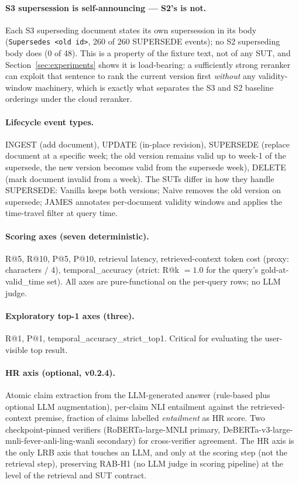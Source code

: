 \documentclass[11pt,a4paper]{article}
\begin{document}
\paragraph{S3 supersession is self-announcing --- S2's is not.} Each S3 superseding document states its own supersession in its body (\texttt{Supersedes <old id>}, 260 of 260 SUPERSEDE events); no S2 superseding body does (0 of 48). This is a property of the fixture text, not of any SUT, and Section~\ref{sec:experiments} shows it is load-bearing: a sufficiently strong reranker can exploit that sentence to rank the current version first \emph{without} any validity-window machinery, which is exactly what separates the S3 and S2 baseline orderings under the cloud reranker.

\paragraph{Lifecycle event types.} INGEST (add document), UPDATE (in-place revision), SUPERSEDE (replace document at a specific week; the old version remains valid up to week-1 of the supersede, the new version becomes valid from the supersede week), DELETE (mark document invalid from a week). The SUTs differ in how they handle SUPERSEDE: Vanilla keeps both versions; Naive removes the old version on supersede; JAMES annotates per-document validity windows and applies the time-travel filter at query time.

\paragraph{Scoring axes (seven deterministic).} R@5, R@10, P@5, P@10, retrieval latency, retrieved-context token cost (proxy: characters $/$ 4), temporal\_accuracy (strict: R@k $= 1.0$ for the query's gold-at-valid\_time set). All axes are pure-functional on the per-query rows; no LLM judge.

\paragraph{Exploratory top-1 axes (three).} R@1, P@1, temporal\_accuracy\_strict\_top1. Critical for evaluating the user-visible top result.

\paragraph{HR axis (optional, v0.2.4).} Atomic claim extraction from the LLM-generated answer (rule-based plus optional LLM augmentation), per-claim NLI entailment against the retrieved-context premise, fraction of claims labelled \emph{entailment} as HR score. Two checkpoint-pinned verifiers (RoBERTa-large-MNLI primary, DeBERTa-v3-large-mnli-fever-anli-ling-wanli secondary) for cross-verifier agreement. The HR axis is the only LRB axis that touches an LLM, and only at the scoring step (not the retrieval step), preserving RAB-H1 (no LLM judge in scoring pipeline) at the level of the retrieval and SUT contract.
\end{document}
